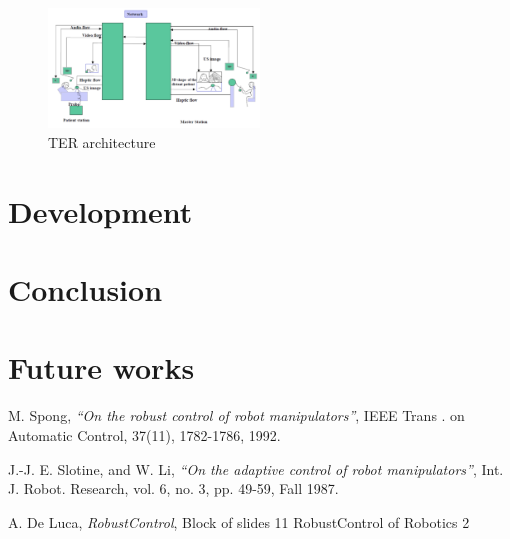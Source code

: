 \documentclass{article}
\begin{document}
\begin{figure}[h]
    \centering
    \includegraphics[width=0.5\textwidth]{TER.png}  
    \caption{TER architecture}
    \label{fig:ter}
\end{figure}


\section{Development}

\section{Conclusion}

\section{Future works}



\begin{thebibliography}{9}

  M. Spong,
  \emph{“On the robust control of robot manipulators”},
   IEEE Trans . on Automatic Control, 37(11), 1782-1786, 1992.

  J.-J. E. Slotine, and W. Li,
  \emph{“On the adaptive control of robot manipulators”},
  Int. J. Robot. Research, vol. 6, no. 3, pp. 49-59, Fall 1987.
   
  A. De Luca,
  \emph{RobustControl},
 Block of slides 11 RobustControl of Robotics 2

\end{thebibliography}
\end{document}
